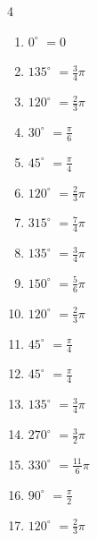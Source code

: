 \begin{multicols}{4}
\begin{enumerate}
  \item $\displaystyle 0^{\circ}$
        $\displaystyle =0$

  \item $\displaystyle 135^{\circ}$
        $\displaystyle =\frac{3}{4}\pi$

  \item $\displaystyle 120^{\circ}$
        $\displaystyle =\frac{2}{3}\pi$

  \item $\displaystyle 30^{\circ}$
        $\displaystyle =\frac{\pi}{6}$

  \item $\displaystyle 45^{\circ}$
        $\displaystyle =\frac{\pi}{4}$

  \item $\displaystyle 120^{\circ}$
        $\displaystyle =\frac{2}{3}\pi$

  \item $\displaystyle 315^{\circ}$
        $\displaystyle =\frac{7}{4}\pi$

  \item $\displaystyle 135^{\circ}$
        $\displaystyle =\frac{3}{4}\pi$

  \item $\displaystyle 150^{\circ}$
        $\displaystyle =\frac{5}{6}\pi$

  \item $\displaystyle 120^{\circ}$
        $\displaystyle =\frac{2}{3}\pi$

  \item $\displaystyle 45^{\circ}$
        $\displaystyle =\frac{\pi}{4}$

  \item $\displaystyle 45^{\circ}$
        $\displaystyle =\frac{\pi}{4}$

  \item $\displaystyle 135^{\circ}$
        $\displaystyle =\frac{3}{4}\pi$

  \item $\displaystyle 270^{\circ}$
        $\displaystyle =\frac{3}{2}\pi$

  \item $\displaystyle 330^{\circ}$
        $\displaystyle =\frac{11}{6}\pi$

  \item $\displaystyle 90^{\circ}$
        $\displaystyle =\frac{\pi}{2}$

  \item $\displaystyle 120^{\circ}$
        $\displaystyle =\frac{2}{3}\pi$


\end{enumerate}
\end{multicols}
